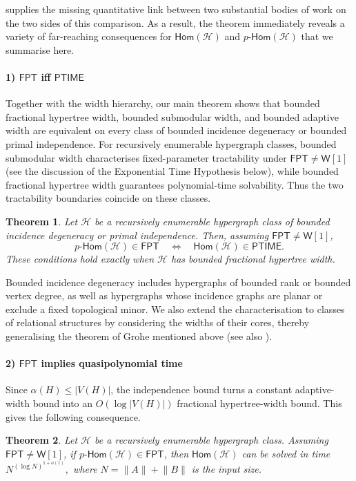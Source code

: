 \documentclass[11pt,letterpaper]{article}
\newtheorem{theorem}{Theorem}[section]
\theoremstyle{definition}
\theoremstyle{remark}
\newcommand{\cH}{\mathcal H}
\newcommand{\Hom}{\mathsf{Hom}}
\newcommand{\pHom}{p\text{-}\mathsf{Hom}}
\newcommand{\FPT}{\ensuremath{\mathsf{FPT}}}
\newcommand{\PTIME}{\mathsf{PTIME}}
\newcommand{\wone}{\ensuremath{\mathsf{W}[1]}}
\providecommand{\FPT}{\ensuremath{\mathsf{FPT}}}
\providecommand{\PTIME}{\mathsf{PTIME}}
\begin{document}
%
%
%
%
%


 supplies the missing quantitative link between two
substantial bodies of work on the two sides of this comparison.
%
%
%
%
%
%
%
%
%
%
%
%
As a result, the theorem immediately reveals a variety of far-reaching consequences for $\Hom(\cH)$ and $\pHom(\cH)$ that we summarise here.



\paragraph{1) $\FPT$ iff $\PTIME$} Together with the width hierarchy, our main theorem shows that bounded fractional hypertree width, bounded submodular width, and bounded adaptive width are equivalent on every class of bounded incidence degeneracy or bounded primal independence.
For recursively enumerable hypergraph classes, bounded submodular width characterises fixed-parameter tractability under $\FPT\ne \wone$ (see the discussion of the Exponential Time Hypothesis below), while bounded fractional hypertree width guarantees polynomial-time solvability. Thus the two tractability boundaries coincide on these classes.
%
%
%
%
%
%
%
%

\begin{theorem}
\label{thm:intro-collapse}
Let $\cH$ be a recursively enumerable hypergraph class of bounded
incidence degeneracy or primal independence. Then, assuming $\FPT \ne \wone$,
\[
 \pHom(\cH)\in\FPT
 \quad\Longleftrightarrow\quad
 \Hom(\cH)\in\PTIME.
\]
These conditions hold exactly when $\cH$ has bounded fractional hypertree width.
\end{theorem}
Bounded incidence degeneracy includes hypergraphs of bounded rank or bounded vertex degree, as well as hypergraphs whose incidence graphs are planar or exclude a fixed topological minor. We also extend the characterisation to classes of relational structures by considering the widths of their cores, thereby generalising the theorem of Grohe mentioned above (see also ).

\paragraph{2) $\FPT$ implies quasipolynomial time}
Since $\alpha(H)\le |V(H)|$, the independence bound turns a
constant adaptive-width bound into an $O(\log|V(H)|)$ fractional
hypertree-width bound. This gives the following consequence.
%
\begin{theorem}
\label{thm:intro-hypergraph-fpt-to-qp}
Let $\cH$ be a recursively enumerable hypergraph class.
Assuming $\FPT\ne \wone$, if $\pHom(\cH)\in\FPT$, then
$\Hom(\cH)$ can be solved in time
\(
 N^{(\log N)^{1+o(1)}},
\)
where $N=\lVert A\rVert+\lVert B\rVert$ is the input size.
%
\end{theorem}
\end{document}
